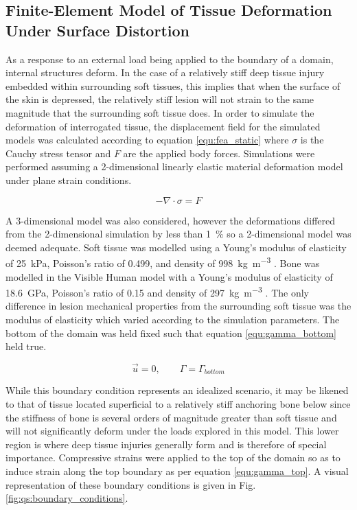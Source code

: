		\subsection{Finite-Element Model of Tissue Deformation Under Surface Distortion}
			As a response to an external load being applied to the boundary of a domain, internal structures deform. In the case of a relatively stiff deep tissue injury embedded within surrounding soft tissues, this implies that when the surface of the skin is depressed, the relatively stiff lesion will not strain to the same magnitude that the surrounding soft tissue does. In order to simulate the deformation of interrogated tissue, the displacement field for the simulated models was calculated according to equation \ref{equ:fea_static} where $\sigma$ is the Cauchy stress tensor and $F$ are the applied body forces. Simulations were performed assuming a 2-dimensional linearly elastic material deformation model under plane strain conditions.

			\begin{equation}
				\label{equ:fea_static}
				- {\nabla} \cdot \sigma = {F}
			\end{equation}
			
			A 3-dimensional model was also considered, however the deformations differed from the 2-dimensional simulation by less than \SI{1}{\percent} so a 2-dimensional model was deemed adequate. Soft tissue was modelled using a Young's modulus of elasticity of \SI{25}{\kPa}, Poisson's ratio of 0.499, and density of \SI{998}{\kg\per\metre\cubed} \cite{krouskop98, choi05, martin94}. Bone was modelled in the Visible Human model with a Young's modulus of elasticity of \SI{18.6}{\GPa}, Poisson's ratio of 0.15 and density of \SI{297}{\kg\per\metre\cubed} \cite{rho93,shahar07,zheng00}. The only difference in lesion mechanical properties from the surrounding soft tissue was the modulus of elasticity which varied according to the simulation parameters. The bottom of the domain was held fixed such that equation \ref{equ:gamma_bottom} held true.

			\begin{equation}
				\label{equ:gamma_bottom}
				\vec{u} = 0, \qquad \Gamma = \Gamma_{bottom}
			\end{equation}

			While this boundary condition represents an idealized scenario, it may be likened to that of tissue located superficial to a relatively stiff anchoring bone below since the stiffness of bone is several orders of magnitude greater than soft tissue and will not significantly deform under the loads explored in this model. This lower region is where deep tissue injuries generally form and is therefore of special importance. Compressive strains were applied to the top of the domain so as to induce strain along the top boundary as per equation \ref{equ:gamma_top}. A visual representation of these boundary conditions is given in Fig. \ref{fig:qs:boundary_conditions}.


